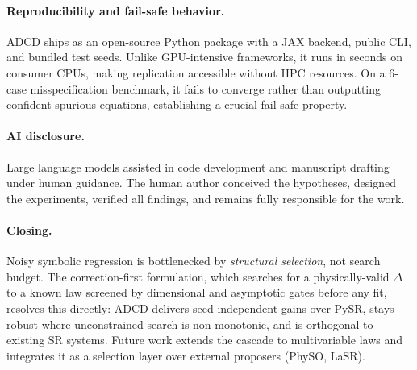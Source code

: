 \documentclass{article}
\begin{document}
\paragraph{Reproducibility and fail-safe behavior.}
ADCD ships as an open-source Python package with a JAX backend, public CLI, and bundled test seeds. Unlike GPU-intensive frameworks, it runs in seconds on consumer CPUs, making replication accessible without HPC resources. On a 6-case misspecification benchmark, it fails to converge rather than outputting confident spurious equations, establishing a crucial fail-safe property.

\paragraph{AI disclosure.} Large language models assisted in code development and manuscript drafting under human guidance. The human author conceived the hypotheses, designed the experiments, verified all findings, and remains fully responsible for the work.

\paragraph{Closing.}
Noisy symbolic regression is bottlenecked by \emph{structural selection}, not search budget. The correction-first formulation, which searches for a physically-valid $\Delta$ to a known law screened by dimensional and asymptotic gates before any fit, resolves this directly: ADCD delivers seed-independent gains over PySR, stays robust where unconstrained search is non-monotonic, and is orthogonal to existing SR systems. Future work extends the cascade to multivariable laws and integrates it as a selection layer over external proposers (PhySO, LaSR).
\end{document}

